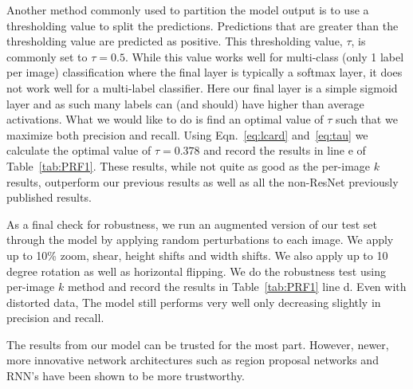 \documentclass[12pt,journal,compsoc]{IEEEtran}
\begin{document}
Another method commonly used to partition the model output is to use a thresholding value to split the predictions. Predictions that are greater than the thresholding value are predicted as positive. This thresholding value, $\tau$, is commonly set to $\tau = 0.5$. While this value works well for multi-class (only 1 label per image) classification where the final layer is typically a softmax layer, it does not work well for a multi-label classifier. Here our final layer is a simple sigmoid layer and as such many labels can (and should) have higher than average activations.  What we would like to do is find an optimal value of $\tau$ such that we maximize both precision and recall. Using Eqn.~\ref{eq:lcard} and~\ref{eq:tau} we calculate the optimal value of $\tau = 0.378$ and record the results in line e of Table~\ref{tab:PRF1}. These results, while not quite as good as the per-image $k$ results, outperform our previous results as well as all the non-ResNet previously published results.

As a final check for robustness, we run an augmented version of our test set through the model by applying random perturbations to each image. We apply up to 10\% zoom, shear, height shifts and width shifts. We also apply up to 10 degree rotation as well as horizontal flipping. We do the robustness test using per-image $k$ method and record the results in Table~\ref{tab:PRF1} line d. Even with distorted data, The model still performs very well only decreasing slightly in precision and recall.

The results from our model can be trusted for the most part. However, newer, more innovative network architectures such as region proposal networks and RNN's have been shown to be more trustworthy.

\end{document}
